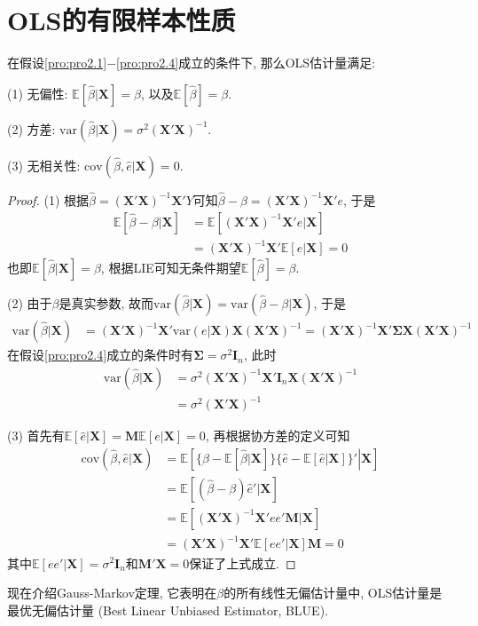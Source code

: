 \documentclass[cn, 12pt, math=mtpro2, bibstyle=apa, blue, twocol]{elegantbook}
\newcommand{\E}{\mathbb{E}}
\newcommand{\var}{\text{var}}
\newcommand{\X}{\mathbold{X}}
\newcommand{\hb}{\hat{\beta}}
\newcommand{\M}{\mathbold{M}}
\begin{document}
\section{OLS的有限样本性质}
\begin{theorem}\label{thm:thm2.2}
  在假设\ref{pro:pro2.1}$-$\ref{pro:pro2.4}成立的条件下, 那么OLS估计量满足:

  (1) 无偏性: $\E[\hat{\beta}|\X]=\beta$, 以及$\E[\hb]=\beta$.

  (2) 方差: $\var(\hb|\X)=\sigma^2(\X'\X)^{-1}$.

  (3) 无相关性: $\text{cov}(\hb,\hat{e}|\X)=0$.
\end{theorem}
\begin{proof}
  (1) 根据$\hat{\beta}=(\X'\X)^{-1}\X'Y$可知$\hat{\beta}-\beta=(\X'\X)^{-1}\X'e$, 于是
  \begin{align*}
  \E[\hb-\beta|\X]&=\E[(\X'\X)^{-1}\X'e|\X] \\
  &=(\X'\X)^{-1}\X'\E[e|\X]=0
  \end{align*}
  也即$\E[\hb|\X]=\beta$, 根据LIE可知无条件期望$\E[\hat{\beta}]=\beta$.

  (2) 由于$\beta$是真实参数, 故而$\var(\hat{\beta}|\X)=\text{var}(\hat{\beta}-\beta|\X)$, 于是
  \begin{align*}
  \var(\hb|\X)&=(\X'\X)^{-1}\X'\var(e|\X)\X(\X'\X)^{-1}=(\X'\X)^{-1}\X'\mathbold{\Sigma}\X(\X'\X)^{-1}
  \end{align*}
  在假设\ref{pro:pro2.4}成立的条件时有$\mathbold{\Sigma}=\sigma^2\mathbold{I}_n$, 此时
  \begin{align*}
  \var(\hb|\X)&=\sigma^2(\X'\X)^{-1}\X'\mathbold{I}_n\X(\X'\X)^{-1} \\
  &=\sigma^2(\X'\X)^{-1}
  \end{align*}

  (3) 首先有$\E[\hat{e}|\X]=\M\E[e|\X]=0$, 再根据协方差的定义可知
  \begin{align*}
  \text{cov}(\hb,\hat{e}|\X)&=\E\left[\left.\{\hb-\E[\hb|\X]\}\{\hat{e}-\E[\hat{e}|\X]\}'\right|\X\right] \\
  &=\E[(\hb-\beta)\hat{e}'|\X] \\
  &=\E[(\X'\X)^{-1}\X'ee'\M|\X] \\
  &=(\X'\X)^{-1}\X'\E[ee'|\X]\mathbold{M}=0
  \end{align*}
  其中$\E[ee'|\X]=\sigma^2\mathbold{I}_n$和$\mathbold{M}'\X=0$保证了上式成立.
\end{proof}
现在介绍Gauss-Markov定理, 它表明在$\beta$的所有线性无偏估计量中, OLS估计量是最优无偏估计量 (Best Linear Unbiased Estimator, BLUE).
\end{document}
